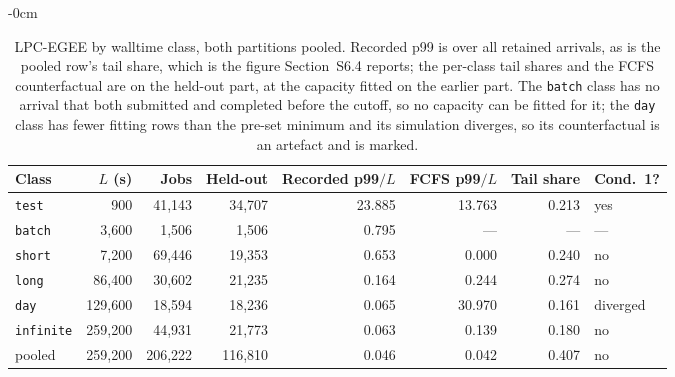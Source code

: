 \documentclass[mathematics,supfile,submit,moreauthors]{Definitions/mdpi}
\newcommand{\devnum}[1]{#1}
\begin{document}
\begin{table}[htbp]
\centering\small
\caption{LPC-EGEE by walltime class, both partitions pooled. Recorded p99 is over all
retained arrivals, as is the pooled row's tail share, which is the figure
Section~S6.4 reports; the per-class tail shares and the FCFS counterfactual are on the
held-out part, at the capacity fitted on the earlier part. The \texttt{batch} class has
no arrival that both submitted and completed before the cutoff, so no capacity can be
fitted for it; the \texttt{day} class has fewer fitting rows than the pre-set minimum and
its simulation diverges, so its counterfactual is an artefact and is marked.}
\label{tab:s_lpc_queues}
\begin{adjustwidth}{-\extralength}{0cm}
\centering
\begin{tabular}{lrrrrrrl}
\toprule
Class & $L$ (s) & Jobs & Held-out & Recorded p99$/L$ & FCFS p99$/L$ & Tail share & Cond.~1? \\
\midrule
\texttt{test} & \devnum{900} & \devnum{41{,}143} & \devnum{34{,}707} & \devnum{23.885} & \devnum{13.763} & \devnum{0.213} & yes \\
\texttt{batch} & \devnum{3{,}600} & \devnum{1{,}506} & \devnum{1{,}506} & \devnum{0.795} & --- & --- & --- \\
\texttt{short} & \devnum{7{,}200} & \devnum{69{,}446} & \devnum{19{,}353} & \devnum{0.653} & \devnum{0.000} & \devnum{0.240} & no \\
\texttt{long} & \devnum{86{,}400} & \devnum{30{,}602} & \devnum{21{,}235} & \devnum{0.164} & \devnum{0.244} & \devnum{0.274} & no \\
\texttt{day} & \devnum{129{,}600} & \devnum{18{,}594} & \devnum{18{,}236} & \devnum{0.065} & \devnum{30.970} & \devnum{0.161} & diverged \\
\texttt{infinite} & \devnum{259{,}200} & \devnum{44{,}931} & \devnum{21{,}773} & \devnum{0.063} & \devnum{0.139} & \devnum{0.180} & no \\
\midrule
pooled & \devnum{259{,}200} & \devnum{206{,}222} & \devnum{116{,}810} & \devnum{0.046} & \devnum{0.042} & \devnum{0.407} & no \\
\bottomrule
\end{tabular}
\end{adjustwidth}
\end{table}
\end{document}
